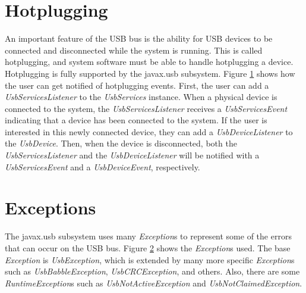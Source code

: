 \documentclass{article}
\newcommand{\myclass}[1]{\emph{#1}}
\newcommand{\myinterface}[1]{\emph{#1}}
\newcommand{\mysectionend}[0]{\vfill\pagebreak[1]}
\begin{document}
\mysectionend

%

\section{Hotplugging}

An important feature of the USB bus is the ability for USB devices to
be connected and disconnected while the system is running.  This is called
hotplugging, and system software must be able to handle hotplugging a device.
Hotplugging is fully supported by the javax.usb subsystem.  Figure
\ref{Hotplugging} shows how the user can get notified of hotplugging events.
First, the user can add a \myinterface{UsbServicesListener} to the \myinterface{UsbServices} instance.
When a physical device is connected to the system, the \myinterface{UsbServicesListener}
receives a \myclass{UsbServicesEvent} indicating that a device has been connected to the
system.  If the user is interested in this newly connected device, they can
add a \myinterface{UsbDeviceListener} to the \myinterface{UsbDevice}.  Then, when the device is
disconnected, both the \myinterface{UsbServicesListener} and the \myinterface{UsbDeviceListener} will be
notified with a \myclass{UsbServicesEvent} and a \myclass{UsbDeviceEvent}, respectively.

\begin{figure}
\label{Hotplugging}
\end{figure}

\mysectionend

%

\section{Exceptions}

The javax.usb subsystem uses many \myclass{Exception}s to represent some of the
errors that can occur on the USB bus.  Figure \ref{Exceptions} shows the
\myclass{Exception}s used.  The base \myclass{Exception} is \myclass{UsbException}, which is extended by
many more specific \myclass{Exception}s such as \myclass{UsbBabbleException}, \myclass{UsbCRCException},
and others.  Also, there are some \myclass{RuntimeException}s such as \myclass{UsbNotActiveException}
and \myclass{UsbNotClaimedException}.

\begin{figure}
\label{Exceptions}
\end{figure}
\end{document}

